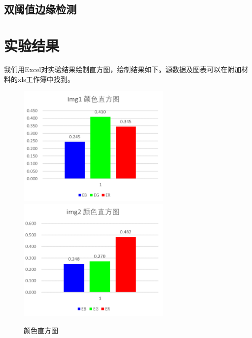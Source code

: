 \documentclass{article}
\begin{document}
\subsection{双阈值边缘检测}


\section{实验结果}

我们用Excel对实验结果绘制直方图，绘制结果如下。源数据及图表可以在附加材料的xls工作簿中找到。

\begin{figure}[htb]
\centering
\includegraphics[width=7.5cm]{img/1-1.png}
\includegraphics[width=7.5cm]{img/1-2.png}
\caption{颜色直方图}
\label{1}
\end{figure}
\end{document}
